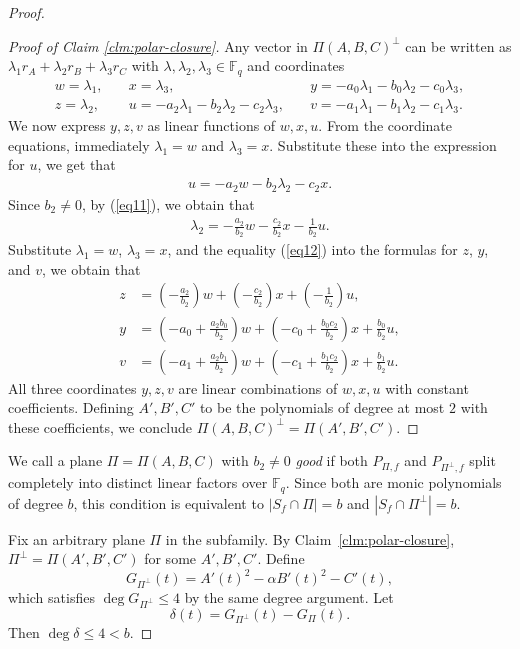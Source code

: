 \documentclass[10pt,a4paper]{amsart}
\begin{document}
\begin{proof}
\begin{proof}[Proof of Claim \ref{clm:polar-closure}]
Any vector in $\Pi(A,B,C)^\perp$ can be written as $\lambda_1 r_A + \lambda_2 r_B + \lambda_3 r_C$ with $\lambda,\lambda_2,\lambda_3 \in \mathbb{F}_q$ and coordinates
\[
\begin{array}{lll}
w = \lambda_1, &\quad x = \lambda_3, &\quad y = -a_0\lambda_1 - b_0\lambda_2 - c_0\lambda_3, \\
z = \lambda_2, &\quad u = -a_2\lambda_1 - b_2\lambda_2 - c_2\lambda_3, &\quad v = -a_1\lambda_1 - b_1\lambda_2- c_1\lambda_3.
\end{array}
\]
We now express $y,z,v$ as linear functions of $w,x,u$. From the coordinate equations, immediately $\lambda_1 = w$ and $\lambda_3 = x$. 
Substitute these into the expression for $u$, we get that 
\begin{align}\label{eq11}
u = -a_2 w - b_2 \lambda_2 - c_2 x.
\end{align}
Since $b_2 \neq 0$, by (\ref{eq11}), we obtain that 
\begin{align}\label{eq12}
\lambda_2 = -\frac{a_2}{b_2} w - \frac{c_2}{b_2} x - \frac{1}{b_2} u.
\end{align}
Substitute $\lambda_1=w$, $\lambda_3=x$, and the equality (\ref{eq12}) into the formulas for $z$, $y$, and $v$, we obtain that
\[
\begin{aligned}
z &= \left(-\frac{a_2}{b_2}\right) w + \left(-\frac{c_2}{b_2}\right) x + \left(-\frac{1}{b_2}\right) u, \\
y&= \left(-a_0 + \frac{a_2 b_0}{b_2}\right) w
+ \left(-c_0 + \frac{b_0 c_2}{b_2}\right) x
+ \frac{b_0}{b_2} u, \\
v&= \left(-a_1 + \frac{a_2 b_1}{b_2}\right) w
+ \left(-c_1 + \frac{b_1 c_2}{b_2}\right) x
+ \frac{b_1}{b_2} u.
\end{aligned}
\]
All three coordinates $y,z,v$ are linear combinations of $w,x,u$ with constant coefficients. Defining $A',B',C'$ to be the  polynomials of degree at most $2$ with these coefficients, we conclude $\Pi(A,B,C)^\perp = \Pi(A',B',C')$.
\end{proof}


We call a plane $\Pi = \Pi(A,B,C)$ with $b_2 \neq 0$ \emph{good} if both $P_{\Pi,f}$ and $P_{\Pi^\perp,f}$ split completely into distinct linear factors over $\mathbb{F}_q$. Since both are monic polynomials of degree $b$, this condition is equivalent to $|S_f \cap \Pi| = b$ and $|S_f \cap \Pi^\perp| = b$.

Fix an arbitrary plane $\Pi$ in the subfamily. By Claim~\ref{clm:polar-closure}, $\Pi^\perp = \Pi(A',B',C')$ for some $A',B',C'$. Define
\[
G_{\Pi^\perp}(t) = A'(t)^2 - \alpha B'(t)^2 - C'(t),
\]
which satisfies $\deg G_{\Pi^\perp} \leq 4$ by the same degree argument. Let
\[
\delta(t) = G_{\Pi^\perp}(t) - G_\Pi(t).
\]
Then $\deg \delta \leq 4 < b$.


\end{proof}
\end{document}
